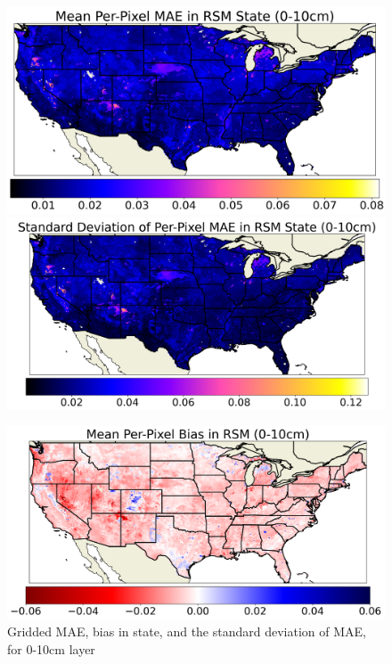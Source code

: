 \begin{figure}[hp!]
    \centering

    \includegraphics[width=.48\linewidth,draft=false]{figures/grid-eval_lstm-rsm-9_full/eval-grid_full_lstm-rsm-9_rsm-10_spatial-stats_abs-err_state-err-abs-mean.png}
    \includegraphics[width=.48\linewidth,draft=false]{figures/grid-eval_lstm-rsm-9_full/eval-grid_full_lstm-rsm-9_rsm-10_spatial-stats_abs-err_state-err-abs-stdev.png}

    \includegraphics[width=.48\linewidth,draft=false]{figures/grid-eval_lstm-rsm-9_full/eval-grid_full_lstm-rsm-9_rsm-10_spatial-stats_bias_state-err-bias-mean.png}

    \caption{Gridded MAE, bias in state, and the standard deviation of MAE, for 0-10cm layer}
    \label{acclstm-rsm-9-grid-rsm-10}
\end{figure}

